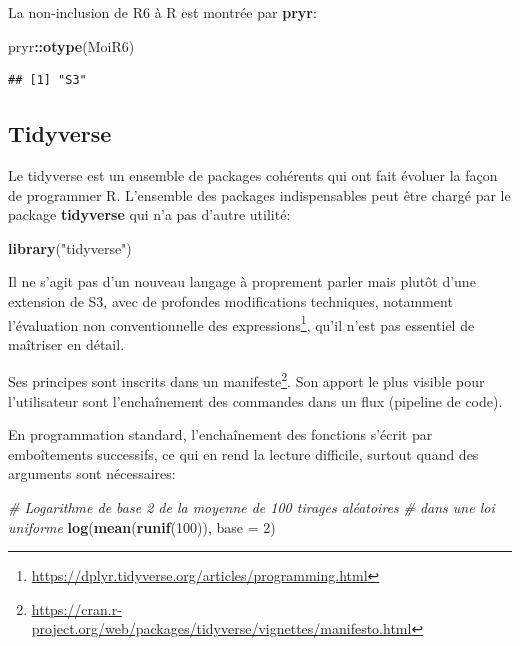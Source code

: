 \documentclass[
  12pt,
  french,
  a4paper,
  extrafontsizes,onecolumn,openright
  ]{memoir}
\newenvironment{Shaded}{\begin{snugshade}}{\end{snugshade}}
\newcommand{\AttributeTok}[1]{\textcolor[rgb]{0.13,0.29,0.53}{#1}}
\newcommand{\CommentTok}[1]{\textcolor[rgb]{0.56,0.35,0.01}{\textit{#1}}}
\newcommand{\DecValTok}[1]{\textcolor[rgb]{0.00,0.00,0.81}{#1}}
\newcommand{\FunctionTok}[1]{\textcolor[rgb]{0.13,0.29,0.53}{\textbf{#1}}}
\newcommand{\NormalTok}[1]{#1}
\newcommand{\SpecialCharTok}[1]{\textcolor[rgb]{0.81,0.36,0.00}{\textbf{#1}}}
\newcommand{\StringTok}[1]{\textcolor[rgb]{0.31,0.60,0.02}{#1}}
\begin{document}
La non-inclusion de R6 à R est montrée par \textbf{pryr}:

\scriptsize

\begin{Shaded}
\begin{Highlighting}[]
\NormalTok{pryr}\SpecialCharTok{::}\FunctionTok{otype}\NormalTok{(MoiR6)}
\end{Highlighting}
\end{Shaded}

\begin{verbatim}
## [1] "S3"
\end{verbatim}

\normalsize

\subsection{Tidyverse}\label{tidyverse}

Le tidyverse est un ensemble de packages cohérents qui ont fait évoluer la façon de programmer R.
L'ensemble des packages indispensables peut être chargé par le package \textbf{tidyverse} qui n'a pas d'autre utilité:

\scriptsize

\begin{Shaded}
\begin{Highlighting}[]
\FunctionTok{library}\NormalTok{(}\StringTok{"tidyverse"}\NormalTok{)}
\end{Highlighting}
\end{Shaded}

\normalsize

Il ne s'agit pas d'un nouveau langage à proprement parler mais plutôt d'une extension de S3, avec de profondes modifications techniques, notamment l'évaluation non conventionnelle des expressions\footnote{\url{https://dplyr.tidyverse.org/articles/programming.html}}, qu'il n'est pas essentiel de maîtriser en détail.

Ses principes sont inscrits dans un manifeste\footnote{\url{https://cran.r-project.org/web/packages/tidyverse/vignettes/manifesto.html}}.
Son apport le plus visible pour l'utilisateur sont l'enchaînement des commandes dans un flux (pipeline de code).

En programmation standard, l'enchaînement des fonctions s'écrit par emboîtements successifs, ce qui en rend la lecture difficile, surtout quand des arguments sont nécessaires:

\scriptsize

\begin{Shaded}
\begin{Highlighting}[]
\CommentTok{\# Logarithme de base 2 de la moyenne de 100 tirages aléatoires }
\CommentTok{\# dans une loi uniforme}
\FunctionTok{log}\NormalTok{(}\FunctionTok{mean}\NormalTok{(}\FunctionTok{runif}\NormalTok{(}\DecValTok{100}\NormalTok{)), }\AttributeTok{base =} \DecValTok{2}\NormalTok{)}
\end{Highlighting}
\end{Shaded}
\end{document}
